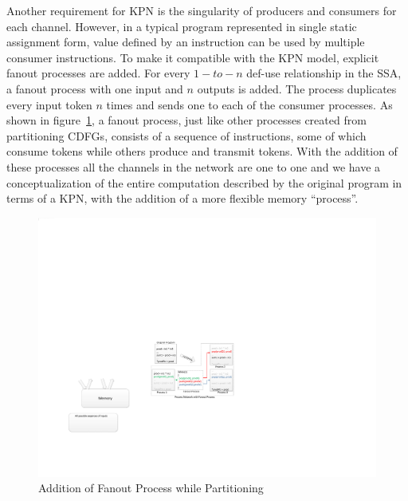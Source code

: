 

%



Another requirement for KPN is the singularity of producers and consumers
for each channel. However, in a typical program represented in single static assignment form, value defined by an instruction can be used by multiple consumer instructions. 
To make it compatible with the KPN model, explicit fanout processes are added.
For every $1-to-n$ def-use relationship in the SSA, a fanout process with one
input and $n$ outputs is added. The process duplicates every input token $n$ times and sends one to each of the consumer processes. 
As shown in figure~\ref{fig:fanout}, a
fanout process, just like other processes created from partitioning CDFGs, consists
of a sequence of instructions, some of which consume tokens while others produce and transmit tokens. 
With the addition of these processes all the channels in the network are one to one and we have a conceptualization of the entire computation described by the original program
in terms of a KPN, with the addition of a more flexible memory ``process''.

\begin{figure}[htp]
\begin{center}
\includegraphics[width=0.65\linewidth]{chap4fig/fanout.pdf}
\caption{Addition of Fanout Process while Partitioning
\label{fig:fanout}}
\end{center}
\end{figure}



